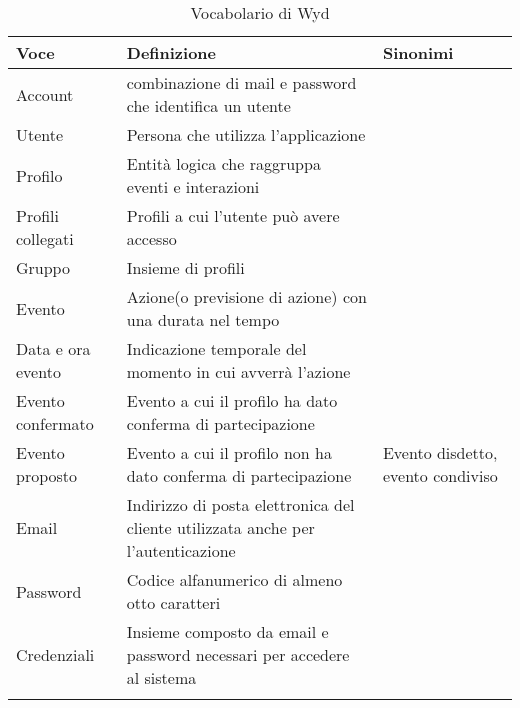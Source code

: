 \begin{longtable} {|P{3.5cm}|P{9cm}|P{3cm}|}
    \hline
    \textbf{Voce}     & \textbf{Definizione}                                                             & \textbf{Sinonimi}                 \\
    \hline
    \endhead
    Account           & combinazione di mail e password che identifica un utente                         &                                   \\
    \hline
    Utente            & Persona che utilizza l'applicazione                                              &                                   \\
    \hline
    Profilo           & Entità logica che raggruppa eventi e interazioni                                 &                                   \\
    \hline
    Profili collegati & Profili a cui l'utente può avere accesso                                         &                                   \\
    \hline
    Gruppo            & Insieme di profili                                                               &                                   \\
    \hline
    Evento            & Azione(o previsione di azione) con una durata nel tempo                          &                                   \\
    \hline
    Data e ora evento & Indicazione temporale del momento in cui avverrà l'azione                        &                                   \\
    \hline
    Evento confermato & Evento a cui il profilo ha dato conferma di partecipazione                       &                                   \\
    \hline
    Evento proposto   & Evento a cui il profilo non ha dato conferma di partecipazione                   & Evento disdetto, evento condiviso \\
    \hline
    Email             & Indirizzo di posta elettronica del cliente utilizzata anche per l'autenticazione &                                   \\
    \hline
    Password          & Codice alfanumerico di almeno otto caratteri                                        &                                   \\
    \hline
    Credenziali       & Insieme composto da email e password necessari per accedere al sistema           &                                   \\
    \hline
    \caption{Vocabolario di Wyd}
\end{longtable}


